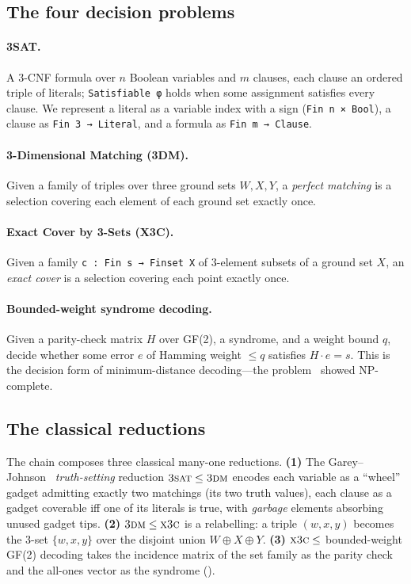 \documentclass[a4paper,UKenglish,cleveref,autoref]{lipics-v2021}
\begin{document}
\subsection{The four decision problems}\label{sec:problems}

\paragraph*{3SAT.} A 3-CNF formula over $n$ Boolean variables and $m$ clauses, each clause an ordered triple of
literals; \lstinline{Satisfiable φ} holds when some assignment satisfies every clause. We represent a literal
as a variable index with a sign (\lstinline{Fin n × Bool}), a clause as \lstinline{Fin 3 → Literal}, and a
formula as \lstinline{Fin m → Clause}.

\paragraph*{3-Dimensional Matching (3DM).} Given a family of triples over three ground sets $W, X, Y$, a
\emph{perfect matching} is a selection covering each element of each ground set exactly once.

\paragraph*{Exact Cover by 3-Sets (X3C).} Given a family \lstinline{c : Fin s → Finset X} of 3-element subsets
of a ground set $X$, an \emph{exact cover} is a selection covering each point exactly once.

\paragraph*{Bounded-weight syndrome decoding.} Given a parity-check matrix $H$ over GF(2), a syndrome, and a
weight bound $q$, decide whether some error $e$ of Hamming weight $\le q$ satisfies $H \cdot e = s$. This is the
decision form of minimum-distance decoding---the problem~\cite{BMvT78} showed NP-complete.

\subsection{The classical reductions}\label{sec:classical}

The chain composes three classical many-one reductions. \textbf{(1)} The Garey--Johnson~\cite{GJ79}
\emph{truth-setting} reduction $\textsc{3sat} \le \textsc{3dm}$ encodes each variable as a ``wheel'' gadget
admitting exactly two matchings (its two truth values), each clause as a gadget coverable iff one of its
literals is true, with \emph{garbage} elements absorbing unused gadget tips. \textbf{(2)}
$\textsc{3dm} \le \textsc{x3c}$ is a relabelling: a triple $(w,x,y)$ becomes the 3-set $\{w,x,y\}$ over the
disjoint union $W \oplus X \oplus Y$. \textbf{(3)} $\textsc{x3c} \le$ bounded-weight GF(2) decoding takes the
incidence matrix of the set family as the parity check and the all-ones vector as the syndrome
().
\end{document}
